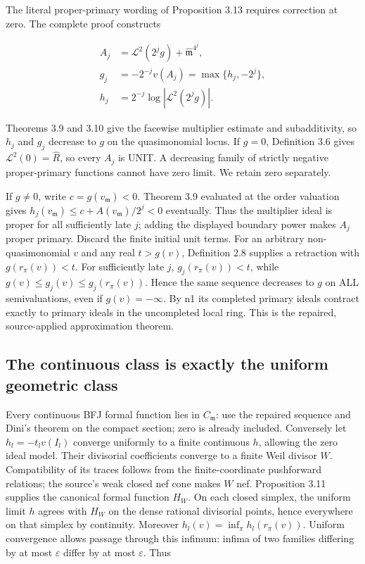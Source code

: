 \documentclass[11pt]{article}
\begin{document}
The literal proper-primary wording of Proposition 3.13 requires correction at zero. The complete proof constructs

\[
\begin{aligned} A_j&=\mathcal L^2(2^j g)+\widehat{\mathfrak m}^{4^j},\\ g_j&=-2^{-j}v(A_j)=\max\{h_j,-2^j\},\\ h_j&=2^{-j}\log|\mathcal L^2(2^j g)|. \end{aligned}
\]

Theorems 3.9 and 3.10 give the facewise multiplier estimate and subadditivity, so $h_j$ and $g_j$ decrease to $g$ on the quasimonomial locus. If $g=0$, Definition 3.6 gives $\mathcal L^2(0)=\widehat R$, so every $A_j$ is UNIT. A decreasing family of strictly negative proper-primary functions cannot have zero limit. We retain zero separately.

If $g\ne0$, write $c=g(v_{\mathfrak m})<0$. Theorem 3.9 evaluated at the order valuation gives $h_j(v_{\mathfrak m})\le c+A(v_{\mathfrak m})/2^j<0$ eventually. Thus the multiplier ideal is proper for all sufficiently late $j$; adding the displayed boundary power makes $A_j$ proper primary. Discard the finite initial unit terms. For an arbitrary non-quasimonomial $v$ and any real $t>g(v)$, Definition 2.8 supplies a retraction with $g(r_\pi(v))<t$. For sufficiently late $j$, $g_j(r_\pi(v))<t$, while $g(v)\le g_j(v)\le g_j(r_\pi(v))$. Hence the same sequence decreases to $g$ on ALL semivaluations, even if $g(v)=-\infty$. By n1 its completed primary ideals contract exactly to primary ideals in the uncompleted local ring. This is the repaired, source-applied approximation theorem.

\subsection{The continuous class is exactly the uniform geometric class}

Every continuous BFJ formal function lies in $C_{\mathfrak m}$: use the repaired sequence and Dini's theorem on the compact section; zero is already included. Conversely let $h_l=-t_l v(I_l)$ converge uniformly to a finite continuous $h$, allowing the zero ideal model. Their divisorial coefficients converge to a finite Weil divisor $W$. Compatibility of its traces follows from the finite-coordinate pushforward relations; the source's weak closed nef cone makes $W$ nef. Proposition 3.11 supplies the canonical formal function $H_W$. On each closed simplex, the uniform limit $h$ agrees with $H_W$ on the dense rational divisorial points, hence everywhere on that simplex by continuity. Moreover $h_l(v)=\inf_\pi h_l(r_\pi(v))$. Uniform convergence allows passage through this infimum: infima of two families differing by at most $\varepsilon$ differ by at most $\varepsilon$. Thus
\end{document}
